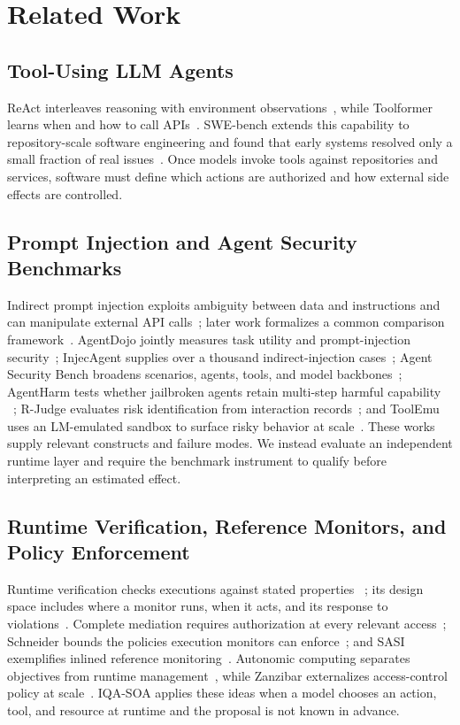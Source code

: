 \documentclass[acmsmall,screen,review,anonymous]{acmart}
\begin{document}
\section{Related Work}
\label{pg:related}

\subsection{Tool-Using LLM Agents}

ReAct interleaves reasoning with environment observations~\cite{react2023}, while
Toolformer learns when and how to call APIs~\cite{toolformer2023}. SWE-bench extends
this capability to repository-scale software engineering and found that early
systems resolved only a small fraction of real issues~\cite{swebench2024}. Once
models invoke tools against repositories and services, software must define which
actions are authorized and how external side effects are controlled.

\subsection{Prompt Injection and Agent Security Benchmarks}
\label{sec:rwbench}

Indirect prompt injection exploits ambiguity between data and instructions and can
manipulate external API calls~\cite{greshake2023}; later work formalizes a common
comparison framework~\cite{liu2024formalizing}. AgentDojo jointly measures task
utility and prompt-injection security~\cite{agentdojo2024}; InjecAgent supplies over
a thousand indirect-injection cases~\cite{injecagent2024}; Agent Security Bench
broadens scenarios, agents, tools, and model backbones~\cite{asb2025}; AgentHarm
tests whether jailbroken agents retain multi-step harmful capability
~\cite{agentharm2025}; R-Judge evaluates risk identification from interaction
records~\cite{rjudge2024}; and ToolEmu uses an LM-emulated sandbox to surface risky
behavior at scale~\cite{toolemu2024}. These works supply relevant constructs and
failure modes. We instead evaluate an independent runtime layer and require the
benchmark instrument to qualify before interpreting an estimated effect.

\subsection{Runtime Verification, Reference Monitors, and Policy Enforcement}

Runtime verification checks executions against stated properties
~\cite{leucker2009}; its design space includes where a monitor runs, when it acts,
and its response to violations~\cite{falcone2021}. Complete mediation requires
authorization at every relevant access~\cite{saltzer1975}; Schneider bounds the
policies execution monitors can enforce~\cite{schneider2000}; and SASI exemplifies
inlined reference monitoring~\cite{sasi1999}. Autonomic computing separates
objectives from runtime management~\cite{kephart2003}, while Zanzibar externalizes
access-control policy at scale~\cite{zanzibar2019}. IQA-SOA applies these ideas when
a model chooses an action, tool, and resource at runtime and the proposal is not
known in advance.
\end{document}
